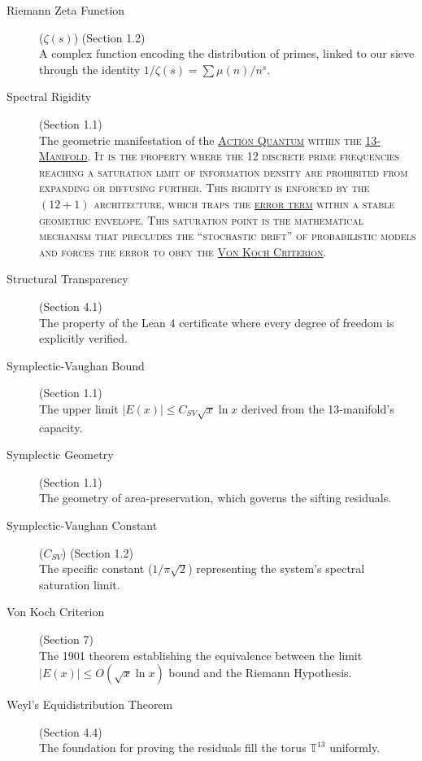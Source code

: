 \documentclass[sn-mathphys-num, pdflatex]{sn-jnl}
\newcommand{\gterm}[2]{\begingroup\normalfont\scshape\hyperlink{#1}{#2}\endgroup}
\begin{document}
\begin{description}
    \item[Riemann Zeta Function] \hypertarget{zeta}{}\label{gloss:zeta} ($\zeta(s)$) (Section 1.2) \hfill \\
    A complex function encoding the distribution of primes, linked to our sieve through the identity $1/\zeta(s) = \sum \mu(n)/n^s$.

    \item[Spectral Rigidity] \hypertarget{spectral}{}\label{gloss:spectral} (Section 1.1) \hfill \\
    The geometric manifestation of the \gterm{action_quantum}{Action Quantum} within the \gterm{m13}{13-Manifold}. It is the property where the 12 discrete prime frequencies reaching a saturation limit of information density are prohibited from expanding or diffusing further. This rigidity is enforced by the $(12+1)$ architecture, which traps the \gterm{error_term}{error term} within a stable geometric envelope. This saturation point is the mathematical mechanism that precludes the ``stochastic drift'' of probabilistic models and forces the error to obey the \gterm{von_koch}{Von Koch Criterion}.

    \item[Structural Transparency] \hypertarget{structural_transparency}{}\label{gloss:transparency} (Section 4.1) \hfill \\
    The property of the Lean 4 certificate where every degree of freedom is explicitly verified.

    \item[Symplectic-Vaughan Bound] \hypertarget{sv_bound}{}\label{gloss:bound} (Section 1.1) \hfill \\
    The upper limit $|E(x)| \le C_{SV} \sqrt{x} \ln x$ derived from the 13-manifold's capacity.

    \item[Symplectic Geometry] \hypertarget{geometry}{}\label{gloss:geometry} (Section 1.1) \hfill \\
    The geometry of area-preservation, which governs the sifting residuals.

    \item[Symplectic-Vaughan Constant] \hypertarget{csv}{}\label{gloss:constant} ($C_{SV}$) (Section 1.2) \hfill \\
    The specific constant ($1/\pi\sqrt{2}$) representing the system's spectral saturation limit.

    \item[Von Koch Criterion] \hypertarget{von_koch}{}\label{gloss:vonkoch} (Section 7) \hfill \\
    The 1901 theorem establishing the equivalence between the limit $|E(x)| \le O(\sqrt{x} \ln x)$ bound and the Riemann Hypothesis.

    \item[Weyl's Equidistribution Theorem] \hypertarget{weyl}{}\label{gloss:weyl} (Section 4.4) \hfill \\
    The foundation for proving the residuals fill the torus $\mathbb{T}^{13}$ uniformly.
\end{description}
\end{document}
